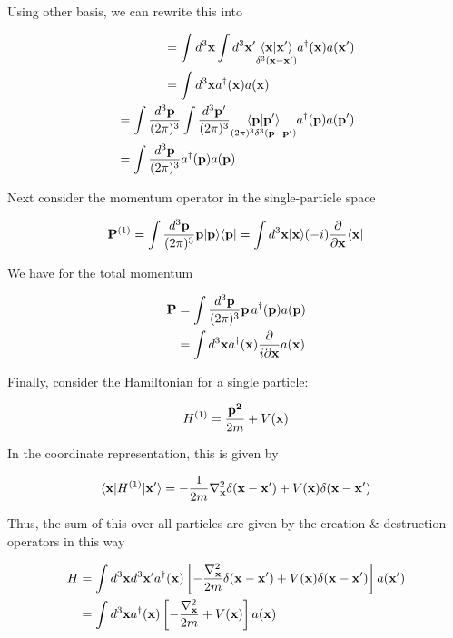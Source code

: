Using other basis, we can rewrite this into

\begin{align}
\begin{split} 
&=\int d^3{\bf x}\int d^3{\bf x'}\underset{\delta^3(\bf x-x')}{\langle\bf x|x'\rangle}a^\dagger({\bf x})a({\bf x'})\\
&=\int d^3{\bf x}a^\dagger({\bf x})a({\bf x})
\end{split}\\
\begin{split}
&=\int \frac{d^3{\bf p}}{(2\pi)^3}\int \frac{d^3\bf p'}{(2\pi)^3}\underset{(2\pi)^3\delta^3(\bf p - p')}{\langle\bf p|p'\rangle}a^\dagger({\bf p})a({\bf p'})\\
&=\int \frac{d^3\bf p}{(2\pi)^3}a^\dagger({\bf p})a({\bf p})
\end{split}
\end{align}

Next consider the momentum operator in the single-particle space

\[{\bf P}^{(1)} = \int \frac{d^3\bf p}{(2\pi)^3}{\bf p}|{\bf p}\rangle\langle{\bf p}| = \int d^3{\bf x}|{\bf x}\rangle(-i)\frac{\partial}{\partial{\bf x}}\langle\bf x|  \]

We have for the total momentum

\begin{align}
\begin{split}
{\bf P} &=  \int \frac{d^3\bf p}{(2\pi)^3}{\bf p}\,a^\dagger({\bf p})a({\bf p})\\& = \int d^3{\bf x}a^\dagger({\bf x})\frac{\partial}{i\partial\bf x}a(\bf x)
\end{split}
\end{align}

Finally, consider the Hamiltonian for a single particle:

\[H^{(1)}=\frac{\bf p^2}{2m}+V(\bf x) \]

In the coordinate representation, this is given by

\[\langle{\bf x}|H^{(1)}|{\bf x'}\rangle = -\frac{1}{2m}\nabla_{\bf x}^2\delta({\bf x-x'})+V({\bf x})\delta(\bf x - x') \]

Thus, the sum of this over all particles are given by the creation \& destruction operators in this way

\begin{align}
\begin{split}
H &= \int d^3{\bf x}d^3{\bf x'}a^\dagger({\bf x})\left[-\frac{\nabla_{\bf x}^2}{2m}\delta({\bf x-x'})+V({\bf x})\delta({\bf x - x'})\right]a(\bf x')\\
&=\int d^3{\bf x}a^\dagger({\bf x})\left[-\frac{\nabla_{\bf x}^2}{2m}+V({\bf x})\right]a(\bf x)
\end{split}
\end{align}

